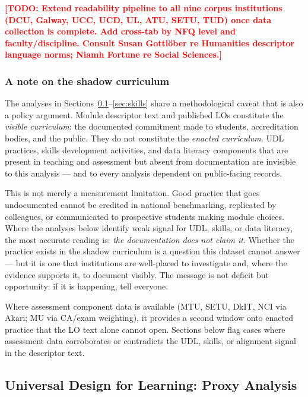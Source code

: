 \documentclass[12pt, a4paper]{article}
\newcommand{\todo}[1]{\textcolor{red}{\textbf{[TODO: #1]}}}
\begin{document}
\todo{Extend readability pipeline to all nine corpus institutions (DCU, Galway, UCC,
UCD, UL, ATU, SETU, TUD) once data collection is complete. Add cross-tab by NFQ level
and faculty/discipline. Consult Susan Gottl{\"o}ber re Humanities descriptor language
norms; Niamh Fortune re Social Sciences.}

\subsubsection*{A note on the shadow curriculum}

The analyses in Sections~\ref{sec:udl}--\ref{sec:skills} share a methodological
caveat that is also a policy argument. Module descriptor text and published LOs
constitute the \textit{visible curriculum}: the documented commitment made to
students, accreditation bodies, and the public. They do not constitute the
\textit{enacted curriculum}. UDL practices, skills development activities, and
data literacy components that are present in teaching and assessment but absent
from documentation are invisible to this analysis --- and to every analysis
dependent on public-facing records.

This is not merely a measurement limitation. Good practice that goes undocumented
cannot be credited in national benchmarking, replicated by colleagues, or
communicated to prospective students making module choices. Where the analyses
below identify weak signal for UDL, skills, or data literacy, the most accurate
reading is: \textit{the documentation does not claim it}. Whether the practice
exists in the shadow curriculum is a question this dataset cannot answer --- but
it is one that institutions are well-placed to investigate and, where the evidence
supports it, to document visibly. The message is not deficit but opportunity:
if it is happening, tell everyone.

Where assessment component data is available (MTU, SETU, DkIT, NCI via Akari;
MU via CA/exam weighting), it provides a second window onto enacted practice
that the LO text alone cannot open. Sections below flag cases where assessment
data corroborates or contradicts the UDL, skills, or alignment signal in the
descriptor text.

\subsection{Universal Design for Learning: Proxy Analysis}
\label{sec:udl}
\end{document}
